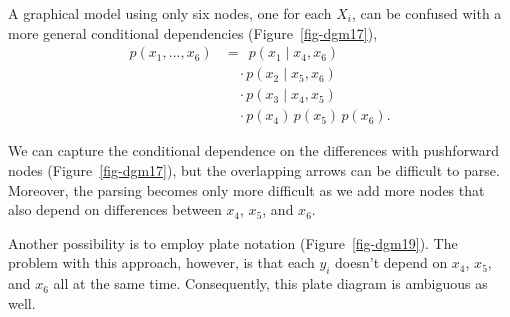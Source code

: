 \documentclass[
  letterpaper,
  DIV=11,
  numbers=noendperiod]{scrartcl}
\begin{document}
A graphical model using only six nodes, one for each \(X_{i}\), can be
confused with a more general conditional dependencies
(Figure~\ref{fig-dgm17}), \begin{align*}
p( x_{1}, \ldots, x_{6}  )
&= \;\,
p ( x_{1} \mid x_{4}, x_{6} )
\\&\quad \cdot
p ( x_{2} \mid x_{5},  x_{6} )
\\
&\quad \cdot
p ( x_{3} \mid x_{4}, x_{5} )
\\
&\quad \cdot
p ( x_{4} ) \,
p ( x_{5} ) \,
p ( x_{6} ).
\end{align*}

We can capture the conditional dependence on the differences with
pushforward nodes (Figure~\ref{fig-dgm17}), but the overlapping arrows
can be difficult to parse. Moreover, the parsing becomes only more
difficult as we add more nodes that also depend on differences between
\(x_{4}\), \(x_{5}\), and \(x_{6}\).

Another possibility is to employ plate notation
(Figure~\ref{fig-dgm19}). The problem with this approach, however, is
that each \(y_{i}\) doesn't depend on \(x_{4}\), \(x_{5}\), and
\(x_{6}\) all at the same time. Consequently, this plate diagram is
ambiguous as well.
\end{document}
